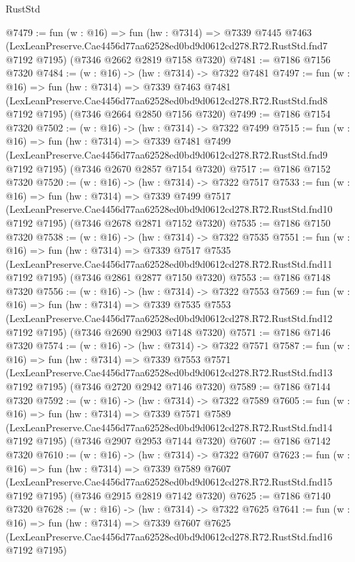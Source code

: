 \begin{lexlean}{RustStd}
\begin{coremodule}
@7479 := fun (w : @16) =>
  fun (hw : @7314) =>
  @7339
    @7445
    @7463
    (LexLeanPreserve.Cae4456d77aa62528ed0bd9d0612cd278.R72.RustStd.fnd7 @7192 @7195)
    (@7346 @2662 @2819 @7158 @7320)
@7481 := @7186 @7156 @7320
@7484 := (w : @16) -> (hw : @7314) -> @7322 @7481
@7497 := fun (w : @16) =>
  fun (hw : @7314) =>
  @7339
    @7463
    @7481
    (LexLeanPreserve.Cae4456d77aa62528ed0bd9d0612cd278.R72.RustStd.fnd8 @7192 @7195)
    (@7346 @2664 @2850 @7156 @7320)
@7499 := @7186 @7154 @7320
@7502 := (w : @16) -> (hw : @7314) -> @7322 @7499
@7515 := fun (w : @16) =>
  fun (hw : @7314) =>
  @7339
    @7481
    @7499
    (LexLeanPreserve.Cae4456d77aa62528ed0bd9d0612cd278.R72.RustStd.fnd9 @7192 @7195)
    (@7346 @2670 @2857 @7154 @7320)
@7517 := @7186 @7152 @7320
@7520 := (w : @16) -> (hw : @7314) -> @7322 @7517
@7533 := fun (w : @16) =>
  fun (hw : @7314) =>
  @7339
    @7499
    @7517
    (LexLeanPreserve.Cae4456d77aa62528ed0bd9d0612cd278.R72.RustStd.fnd10 @7192 @7195)
    (@7346 @2678 @2871 @7152 @7320)
@7535 := @7186 @7150 @7320
@7538 := (w : @16) -> (hw : @7314) -> @7322 @7535
@7551 := fun (w : @16) =>
  fun (hw : @7314) =>
  @7339
    @7517
    @7535
    (LexLeanPreserve.Cae4456d77aa62528ed0bd9d0612cd278.R72.RustStd.fnd11 @7192 @7195)
    (@7346 @2861 @2877 @7150 @7320)
@7553 := @7186 @7148 @7320
@7556 := (w : @16) -> (hw : @7314) -> @7322 @7553
@7569 := fun (w : @16) =>
  fun (hw : @7314) =>
  @7339
    @7535
    @7553
    (LexLeanPreserve.Cae4456d77aa62528ed0bd9d0612cd278.R72.RustStd.fnd12 @7192 @7195)
    (@7346 @2690 @2903 @7148 @7320)
@7571 := @7186 @7146 @7320
@7574 := (w : @16) -> (hw : @7314) -> @7322 @7571
@7587 := fun (w : @16) =>
  fun (hw : @7314) =>
  @7339
    @7553
    @7571
    (LexLeanPreserve.Cae4456d77aa62528ed0bd9d0612cd278.R72.RustStd.fnd13 @7192 @7195)
    (@7346 @2720 @2942 @7146 @7320)
@7589 := @7186 @7144 @7320
@7592 := (w : @16) -> (hw : @7314) -> @7322 @7589
@7605 := fun (w : @16) =>
  fun (hw : @7314) =>
  @7339
    @7571
    @7589
    (LexLeanPreserve.Cae4456d77aa62528ed0bd9d0612cd278.R72.RustStd.fnd14 @7192 @7195)
    (@7346 @2907 @2953 @7144 @7320)
@7607 := @7186 @7142 @7320
@7610 := (w : @16) -> (hw : @7314) -> @7322 @7607
@7623 := fun (w : @16) =>
  fun (hw : @7314) =>
  @7339
    @7589
    @7607
    (LexLeanPreserve.Cae4456d77aa62528ed0bd9d0612cd278.R72.RustStd.fnd15 @7192 @7195)
    (@7346 @2915 @2819 @7142 @7320)
@7625 := @7186 @7140 @7320
@7628 := (w : @16) -> (hw : @7314) -> @7322 @7625
@7641 := fun (w : @16) =>
  fun (hw : @7314) =>
  @7339
    @7607
    @7625
    (LexLeanPreserve.Cae4456d77aa62528ed0bd9d0612cd278.R72.RustStd.fnd16 @7192 @7195)

\end{coremodule}
\end{lexlean}
